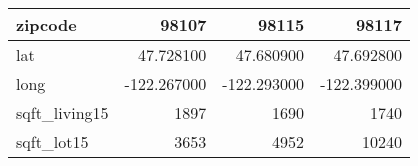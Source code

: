 \begin{table}[H]
\begin{tabular}{|l|r|r|r|}
\hline zipcode & \cellcolor[rgb]{0.9, 0.54, 0.52} 98107 & 98115 & 98117 \\
\hline lat & \cellcolor[rgb]{0.9, 0.54, 0.52} 47.728100 & 47.680900 & 47.692800 \\
\hline long & \cellcolor[rgb]{0.9, 0.54, 0.52} -122.267000 & \cellcolor[rgb]{0.9, 0.54, 0.52} -122.293000 & \cellcolor[rgb]{0.9, 0.54, 0.52} -122.399000 \\
\hline sqft\_living15 & \cellcolor[rgb]{0.9, 0.54, 0.52} 1897 & 1690 & 1740 \\
\hline sqft\_lot15 & \cellcolor[rgb]{0.9, 0.54, 0.52} 3653 & 4952 & 10240 \\
\hline
\end{tabular}
\end{table}
